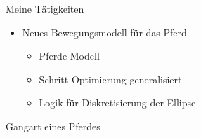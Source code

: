 \graphicspath{{images/}{images/logos/}}

\begin{frame}{Meine Tätigkeiten}
	\begin{itemize}
		\item Neues Bewegungsmodell für das Pferd
		\begin{itemize}
			\item Pferde Modell
			\item Schritt Optimierung generalisiert
			\item Logik für Diskretisierung der Ellipse
		\end{itemize}
	\end{itemize}
\end{frame}  


\begin{frame}{Gangart eines Pferdes}
	\begin{center}
						
	\end{center}
\end{frame}

